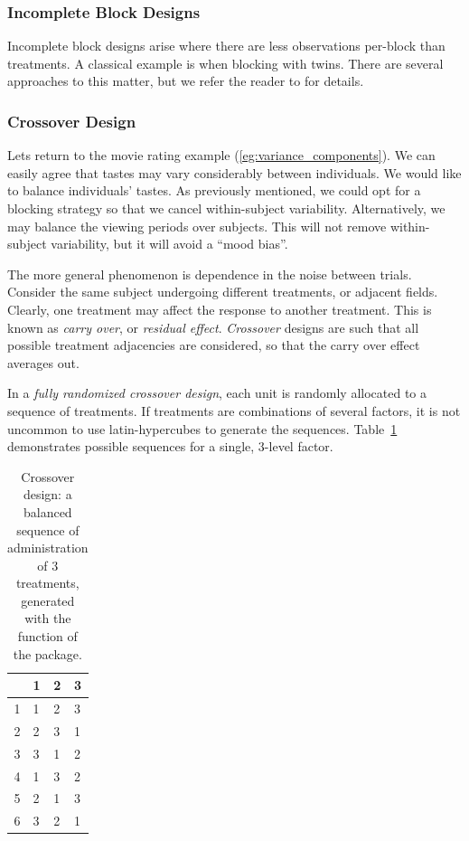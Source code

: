 \subsubsection{Incomplete Block Designs}
Incomplete block designs arise where there are less observations per-block than treatments. 
A classical example is when blocking with twins.
There are several approaches to this matter, but we refer the reader to \cite[Sec.4.2]{cox_theory_2000} for details.




\subsubsection{Crossover Design}
Lets return to the movie rating example (\ref{eg:variance_components}).
We can easily agree that tastes may vary considerably between individuals. 
We would like to balance individuals' tastes.
As previously mentioned, we could opt for a blocking strategy so that we cancel within-subject variability.
Alternatively, we may balance the viewing periods over subjects. 
This will not remove within-subject variability, but it will avoid a ``mood bias''.

The more general phenomenon is dependence in the noise between trials. 
Consider the same subject undergoing different treatments, or adjacent fields. 
Clearly, one treatment may affect the response to another treatment. This is known as \emph{carry over}, or \emph{residual effect}. 
\emph{Crossover} designs are such that all possible treatment adjacencies are considered, so that the carry over effect averages out. 

In a \emph{fully randomized crossover design}, each unit is randomly allocated to a sequence of treatments.
If treatments are combinations of several factors, it is not uncommon to use latin-hypercubes to generate the sequences. Table~\ref{tab:crossover} demonstrates possible sequences for a single, $3$-level factor.
\begin{table}[ht]
\centering
\begin{tabular}{rlll}
  \hline
 & 1 & 2 & 3 \\ 
  \hline
1 & 1 & 2 & 3 \\ 
  2 & 2 & 3 & 1 \\ 
  3 & 3 & 1 & 2 \\ 
  4 & 1 & 3 & 2 \\ 
  5 & 2 & 1 & 3 \\ 
  6 & 3 & 2 & 1 \\ 
   \hline
\end{tabular}
\label{tab:crossover}
\caption[Crossover Design]{Crossover design: a balanced sequence of administration of $3$ treatments, generated with the  function of the  \R package. }
\end{table}






